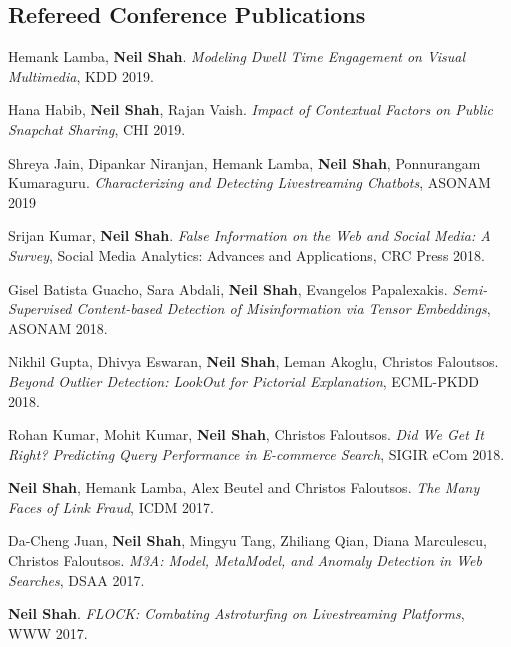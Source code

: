 \documentclass{article}
\begin{document}
\subsection*{\bf {Refereed Conference Publications}}
\begin{etaremune}[itemsep=1pt,parsep=0pt]

\item Hemank Lamba, {\bf Neil Shah}.  \emph{Modeling Dwell Time Engagement on Visual Multimedia}, KDD 2019.  

\item Hana Habib, {\bf Neil Shah}, Rajan Vaish.  \emph{Impact of Contextual Factors on Public Snapchat Sharing}, CHI 2019.

\item Shreya Jain, Dipankar Niranjan, Hemank Lamba, {\bf Neil Shah}, Ponnurangam Kumaraguru.  \emph{Characterizing and Detecting Livestreaming Chatbots}, ASONAM 2019

\item Srijan Kumar, {\bf Neil Shah}.  \emph{False Information on the Web and Social Media: A Survey}, Social Media Analytics: Advances and Applications, CRC Press 2018.  

\item Gisel Batista Guacho, Sara Abdali, {\bf Neil Shah}, Evangelos Papalexakis.  \emph{Semi-Supervised Content-based Detection of Misinformation via Tensor Embeddings}, ASONAM 2018.  

\item Nikhil Gupta, Dhivya Eswaran, {\bf Neil Shah}, Leman Akoglu, Christos Faloutsos. \emph{Beyond Outlier Detection: LookOut for Pictorial Explanation}, ECML-PKDD 2018.

\item Rohan Kumar, Mohit Kumar, {\bf Neil Shah}, Christos Faloutsos. \emph{Did We Get It Right? Predicting Query Performance in E-commerce Search}, SIGIR eCom 2018.

\item {\bf Neil Shah}, Hemank Lamba, Alex Beutel and Christos Faloutsos. \emph{The Many Faces of Link Fraud}, ICDM 2017.

\item Da-Cheng Juan, {\bf Neil Shah}, Mingyu Tang, Zhiliang Qian, Diana Marculescu, Christos Faloutsos. \emph{M3A: Model, MetaModel, and Anomaly Detection in Web Searches}, DSAA 2017.

\item {\bf Neil Shah}. \emph{FLOCK: Combating Astroturfing on Livestreaming Platforms}, WWW 2017.


\end{etaremune}
\end{document}

